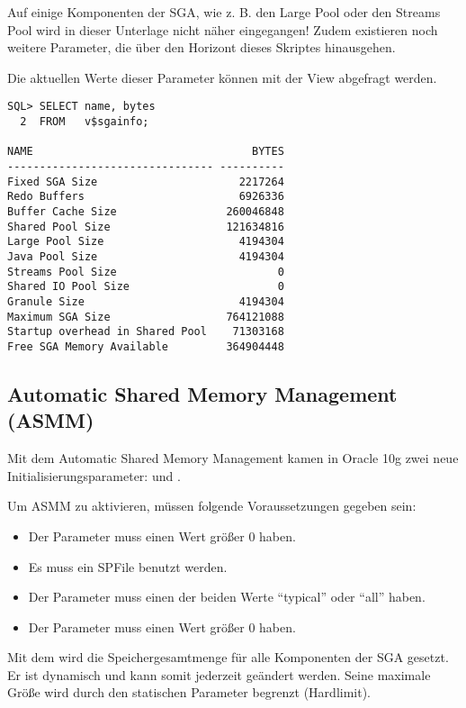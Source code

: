         \begin{merke}
          Auf einige Komponenten der SGA, wie z. B. den Large Pool oder den Streams Pool wird in dieser Unterlage nicht näher eingegangen! Zudem existieren noch weitere Parameter, die über den Horizont dieses Skriptes hinausgehen.
        \end{merke}
\clearpage		
        Die aktuellen Werte dieser Parameter können mit der View  abgefragt werden.
        \begin{lstlisting}[caption={Größe der SGA-Komponenten ermitteln},label=admin22,language=oracle_sql]
SQL> SELECT name, bytes
  2  FROM   v$sgainfo;

NAME                                  BYTES
-------------------------------- ----------
Fixed SGA Size                      2217264
Redo Buffers                        6926336
Buffer Cache Size                 260046848
Shared Pool Size                  121634816
Large Pool Size                     4194304
Java Pool Size                      4194304
Streams Pool Size                         0
Shared IO Pool Size                       0
Granule Size                        4194304
Maximum SGA Size                  764121088
Startup overhead in Shared Pool    71303168
Free SGA Memory Available         364904448
        \end{lstlisting}
      \subsection{Automatic Shared Memory Management (ASMM)}
        Mit dem Automatic Shared Memory Management kamen in Oracle 10g zwei neue Initialisierungsparameter:  und .

        Um ASMM zu aktivieren, müssen folgende Voraussetzungen gegeben sein:
        \begin{itemize}
          \item Der Parameter  muss einen Wert größer 0 haben.
          \item Es muss ein SPFile benutzt werden.
          \item Der Parameter  muss einen der beiden Werte \enquote{typical} oder \enquote{all} haben.
          \item Der Parameter  muss einen Wert größer 0 haben.
        \end{itemize}
        Mit dem  wird die Speichergesamtmenge für alle Komponenten der SGA gesetzt. Er ist dynamisch und kann somit jederzeit geändert werden. Seine maximale Größe wird durch den statischen Parameter  begrenzt (Hardlimit).


